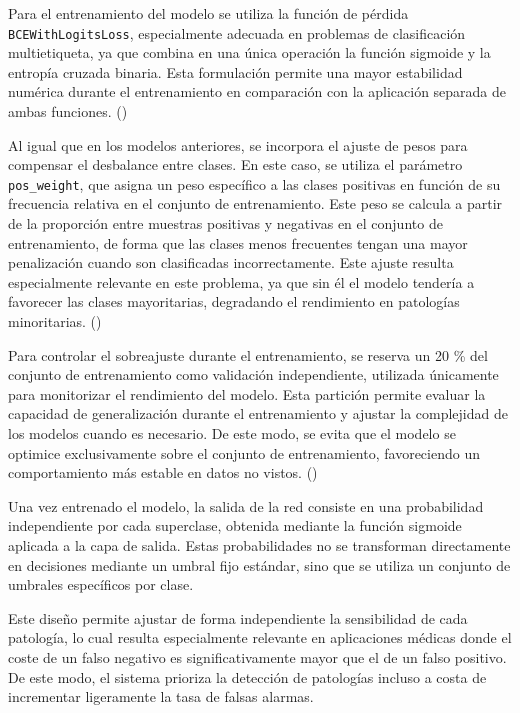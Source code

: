 \documentclass[12pt,a4paper,twoside]{book}
\begin{document}
Para el entrenamiento del modelo se utiliza la función de pérdida \texttt{BCEWithLogitsLoss}, especialmente adecuada en problemas de clasificación multietiqueta, ya que combina en una única operación la función sigmoide y la entropía cruzada binaria. 
Esta formulación permite una mayor estabilidad numérica durante el entrenamiento en comparación con la aplicación separada de ambas funciones. (\cite{pytorch_bcewithlogitsloss})

Al igual que en los modelos anteriores, se incorpora el ajuste de pesos para compensar el desbalance entre clases. 
En este caso, se utiliza el parámetro \texttt{pos\_weight}, que asigna un peso específico a las clases positivas en función de su frecuencia relativa en el conjunto de entrenamiento.
Este peso se calcula a partir de la proporción entre muestras positivas y negativas en el conjunto de entrenamiento, de forma que las clases menos frecuentes tengan una mayor penalización cuando son clasificadas incorrectamente. 
Este ajuste resulta especialmente relevante en este problema, ya que sin él el modelo tendería a favorecer las clases mayoritarias, degradando el rendimiento en patologías minoritarias. (\cite{pytorch_bcewithlogitsloss})

Para controlar el sobreajuste durante el entrenamiento, se reserva un 20 \% del conjunto de entrenamiento como validación independiente, utilizada únicamente para monitorizar el rendimiento del modelo. 
Esta partición permite evaluar la capacidad de generalización durante el entrenamiento y ajustar la complejidad de los modelos cuando es necesario. 
De este modo, se evita que el modelo se optimice exclusivamente sobre el conjunto de entrenamiento, favoreciendo un comportamiento más estable en datos no vistos. (\cite{duran2019_regularization_nn})

Una vez entrenado el modelo, la salida de la red consiste en una probabilidad independiente por cada superclase, obtenida mediante la función sigmoide aplicada a la capa de salida. 
Estas probabilidades no se transforman directamente en decisiones mediante un umbral fijo estándar, sino que se utiliza un conjunto de umbrales específicos por clase.

Este diseño permite ajustar de forma independiente la sensibilidad de cada patología, lo cual resulta especialmente relevante en aplicaciones médicas donde el coste de un falso negativo es significativamente mayor que el de un falso positivo. 
De este modo, el sistema prioriza la detección de patologías incluso a costa de incrementar ligeramente la tasa de falsas alarmas.
\end{document}
